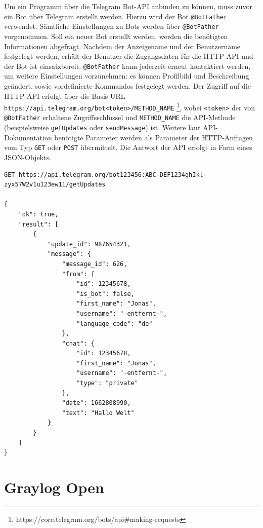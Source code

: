 Um ein Programm über die Telegram Bot-API anbinden zu können, muss zuvor ein Bot über Telegram erstellt werden. Hierzu wird der Bot \lstinline{@BotFather} verwendet. Sämtliche Einstellungen zu Bots werden über \lstinline{@BotFather} vorgenommen. Soll ein neuer Bot erstellt werden, werden die benötigten Informationen abgefragt. Nachdem der Anzeigename und der Benutzername festgelegt werden, erhält der Benutzer die Zugangsdaten für die HTTP-API und der Bot ist einsatzbereit. \lstinline{@BotFather} kann jederzeit erneut kontaktiert werden, um weitere Einstellungen vorzunehmen: es können Profilbild und Beschreibung geändert, sowie vordefinierte Kommandos festgelegt werden. Der Zugriff auf die HTTP-API erfolgt über die Basis-URL \lstinline{https://api.telegram.org/bot<token>/METHOD_NAME} \footnote{https://core.telegram.org/bots/api\#making-requests}, wobei \lstinline{<token>} der von \lstinline{@BotFather} erhaltene Zugriffsschlüssel und \lstinline{METHOD_NAME} die API-Methode (beispielsweise \lstinline{getUpdates} oder \lstinline{sendMessage}) ist. Weitere laut API-Dokumentation benötigte Parameter werden als Parameter der HTTP-Anfragen vom Typ \lstinline{GET} oder \lstinline{POST} übermittelt. Die Antwort der API erfolgt in Form eines JSON-Objekts.

\begin{lstlisting}[caption={Beispiel eines Aufrufs der Telegram HTTP-API. Erhalt einer Textnachricht "Hallo Welt".}, label=lst:bsp-telegram-api]
GET https://api.telegram.org/bot123456:ABC-DEF1234ghIkl-zyx57W2v1u123ew11/getUpdates

{
    "ok": true,
    "result": [
        {
            "update_id": 987654321,
            "message": {
                "message_id": 626,
                "from": {
                    "id": 12345678,
                    "is_bot": false,
                    "first_name": "Jonas",
                    "username": "-entfernt-",
                    "language_code": "de"
                },
                "chat": {
                    "id": 12345678,
                    "first_name": "Jonas",
                    "username": "-entfernt-",
                    "type": "private"
                },
                "date": 1662808990,
                "text": "Hallo Welt"
            }
        }
    ]
}
\end{lstlisting}

\section{Graylog Open}

